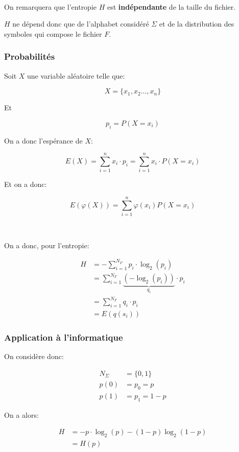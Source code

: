 \documentclass[a4paper,11pt]{article}
\newcommand{\ti}{\cdot}
\begin{document}
\

On remarquera que l'entropie $H$ est \textbf{indépendante} de la taille du
fichier.

$H$ ne dépend donc que de l'alphabet considéré $\Sigma$ et de la distribution
des symboles qui compose le fichier $F$.

\subsubsection{Probabilités}

Soit $X$ une variable aléatoire telle que:

$$ X = \{x_1, x_2 ..., x_n\}$$

Et

$$ p_i = P(X = x_i) $$

On a donc l'espérance de $X$:

$$ E(X) = \sum_{i = 1}^nx_i \ti p_i = \sum_{i = 1}^nx_i \ti P(X = x_i) $$

Et on a donc:

$$ E(\varphi(X)) = \sum_{i = 1}^n \varphi(x_i) P(X = x_i) $$

\

On a donc, pour l'entropie:

\begin{align*}
  H &= - \sum_{i = 1}^{N_F}p_i \ti \log_2(p_i) \\
    &= \sum_{i = 1}^{N_F} \underbrace{(- \log_2(p_i))}_{q_i} \ti p_i \\
    &= \sum_{i = 1}^{N_F} q_i \ti p_i \\
    &= E(q(s_i))
\end{align*}

\subsubsection{Application à l'informatique}

On considère donc:

\begin{align*}
  N_\Sigma &= \{0, 1\} \\
  p(0) &= p_0 = p \\
  p(1) &= p_1 = 1 - p
\end{align*}

On a alors:

\begin{align*}
  H &= -p \ti \log_2(p) - (1 - p) \log_2(1 - p) \\
    &= H(p)
\end{align*}
\end{document}
